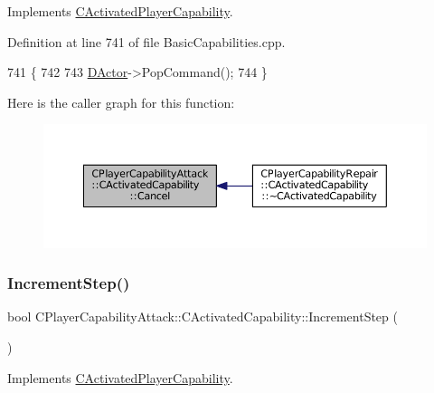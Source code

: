 Implements \hyperlink{classCActivatedPlayerCapability_a5cde83be468e262ad054d81e28684a81}{C\+Activated\+Player\+Capability}.



Definition at line 741 of file Basic\+Capabilities.\+cpp.


\begin{DoxyCode}
741                                                         \{
742 
743     \hyperlink{classCActivatedPlayerCapability_a54ca944b47bff2718330639941d402b0}{DActor}->PopCommand();
744 \}
\end{DoxyCode}
Here is the caller graph for this function\+:
\nopagebreak
\begin{figure}[H]
\begin{center}
\leavevmode
\includegraphics[width=350pt]{classCPlayerCapabilityAttack_1_1CActivatedCapability_a0796fbda8a35b60a2320becfdf2b5c13_icgraph}
\end{center}
\end{figure}
\hypertarget{classCPlayerCapabilityAttack_1_1CActivatedCapability_a6b772cbd6be96fbd9bf88380b143856c}{}\label{classCPlayerCapabilityAttack_1_1CActivatedCapability_a6b772cbd6be96fbd9bf88380b143856c} 
\subsubsection{\texorpdfstring{Increment\+Step()}{IncrementStep()}}
{\footnotesize\ttfamily bool C\+Player\+Capability\+Attack\+::\+C\+Activated\+Capability\+::\+Increment\+Step (\begin{DoxyParamCaption}{ }\end{DoxyParamCaption})\hspace{0.3cm}{\ttfamily [virtual]}}



Implements \hyperlink{classCActivatedPlayerCapability_a943b5999a57504399293250382c0ec6a}{C\+Activated\+Player\+Capability}.



